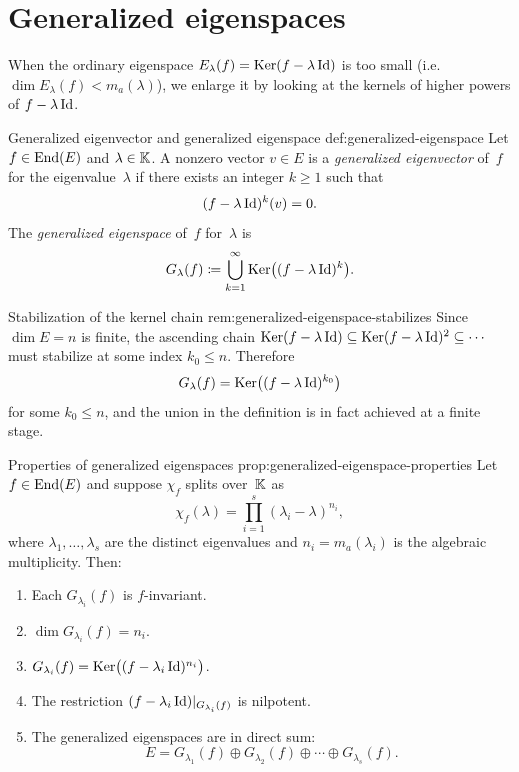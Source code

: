 \section{Generalized eigenspaces}\label{sec:generalized-eigenspaces}

When the ordinary eigenspace $E_\lambda(f) = \operatorname{Ker}(f - \lambda\operatorname{Id})$ is
too small (i.e.\ $\dim E_\lambda(f) < m_a(\lambda)$), we enlarge it
by looking at the kernels of higher powers of $f - \lambda\operatorname{Id}$.

\begin{definition}{Generalized eigenvector and generalized eigenspace}%
{def:generalized-eigenspace}
Let $f \in \operatorname{End}(E)$ and $\lambda \in {\mathbb{K}}$.  A nonzero vector
$v \in E$ is a \emph{generalized eigenvector} of~$f$ for the
eigenvalue~$\lambda$ if there exists an integer $k \geq 1$ such that
\[
  (f - \lambda\operatorname{Id})^k(v) = 0.
\]
The \emph{generalized eigenspace} of~$f$ for~$\lambda$ is
\[
  G_\lambda(f) \coloneqq \bigcup_{k=1}^{\infty} \operatorname{Ker}\bigl(
    (f - \lambda\operatorname{Id})^k
  \bigr).
\]
\end{definition}

\begin{remark}{Stabilization of the kernel chain}%
{rem:generalized-eigenspace-stabilizes}
Since $\dim E = n$ is finite, the ascending chain
$\operatorname{Ker}(f - \lambda\operatorname{Id}) \subseteq \operatorname{Ker}(f - \lambda\operatorname{Id})^2 \subseteq
\cdots$ must stabilize at some index $k_0 \leq n$.  Therefore
\[
  G_\lambda(f) = \operatorname{Ker}\bigl((f - \lambda\operatorname{Id})^{k_0}\bigr)
\]
for some $k_0 \leq n$, and the union in the definition is in fact
achieved at a finite stage.
\end{remark}

\begin{proposition}{Properties of generalized eigenspaces}%
{prop:generalized-eigenspace-properties}
Let $f \in \operatorname{End}(E)$ and suppose $\chi_f$ splits over~${\mathbb{K}}$ as
\[
  \chi_f(\lambda) = \prod_{i=1}^{s} (\lambda_i - \lambda)^{n_i},
\]
where $\lambda_1, \ldots, \lambda_s$ are the distinct eigenvalues
and $n_i = m_a(\lambda_i)$ is the algebraic multiplicity.  Then:
\begin{enumerate}[label=(\roman*)]
  \item\label{it:gen-eig-f-inv}
    Each $G_{\lambda_i}(f)$ is $f$-invariant.
  \item\label{it:gen-eig-dim}
    $\dim G_{\lambda_i}(f) = n_i$.
  \item\label{it:gen-eig-kernel}
    $G_{\lambda_i}(f) = \operatorname{Ker}\bigl((f - \lambda_i\operatorname{Id})^{n_i}\bigr)$.
  \item\label{it:gen-eig-restriction}
    The restriction $(f - \lambda_i\operatorname{Id}){|_{G_{\lambda_i}(f)}}$
    is nilpotent.
  \item\label{it:gen-eig-direct-sum}
    The generalized eigenspaces are in direct sum:
    \[
      E = G_{\lambda_1}(f) \oplus G_{\lambda_2}(f) \oplus \cdots
        \oplus G_{\lambda_s}(f).
    \]
\end{enumerate}
\end{proposition}

